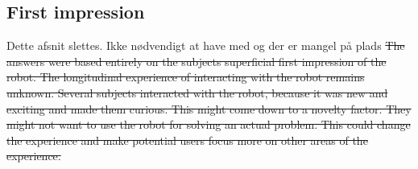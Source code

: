 \subsection{First impression}
{\color{red} Dette afsnit slettes. Ikke nødvendigt at have med og der er mangel på plads}
\sout{The answers were based entirely on the subjects superficial first impression of the robot. The longitudinal experience of interacting with the robot remains unknown. Several subjects interacted with the robot, because it was new and exciting and made them curious. This might come down to a novelty factor. They might not want to use the robot for solving an actual problem. This could change the experience and make potential users focus more on other areas of the experience.}